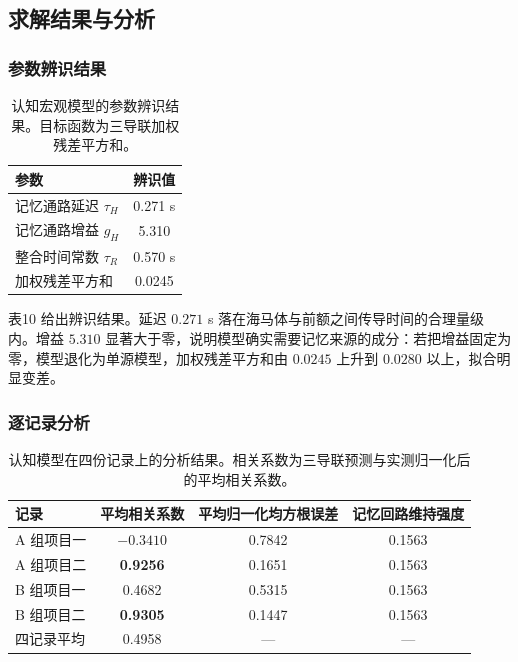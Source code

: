 \documentclass[bwprint]{gmcmthesis}
\begin{document}
\subsection{求解结果与分析}

\subsubsection{参数辨识结果}

\begin{table}[htp!]
\centering
\renewcommand\arraystretch{1.2}
\caption{认知宏观模型的参数辨识结果。目标函数为三导联加权残差平方和。}
\begin{tabular}{|l|c|}
  \hline
  参数 & 辨识值 \\
  \hline
  记忆通路延迟 $\tau_H$ & 0.271 s \\
  \hline
  记忆通路增益 $g_H$ & 5.310 \\
  \hline
  整合时间常数 $\tau_R$ & 0.570 s \\
  \hline
  加权残差平方和 & 0.0245 \\
  \hline
\end{tabular}
\end{table}

表10 给出辨识结果。延迟 $0.271$ s 落在海马体与前额之间传导时间的合理量级内。增益 $5.310$ 显著大于零，说明模型确实需要记忆来源的成分：若把增益固定为零，模型退化为单源模型，加权残差平方和由 $0.0245$ 上升到 $0.0280$ 以上，拟合明显变差。

\subsubsection{逐记录分析}

\begin{table}[htp!]
\centering
\renewcommand\arraystretch{1.2}
\caption{认知模型在四份记录上的分析结果。相关系数为三导联预测与实测归一化后的平均相关系数。}
\begin{tabular}{|l|c|c|c|}
  \hline
  记录 & 平均相关系数 & 平均归一化均方根误差 & 记忆回路维持强度 \\
  \hline
  A 组项目一 & $-0.3410$ & 0.7842 & 0.1563 \\
  \hline
  A 组项目二 & \textbf{0.9256} & 0.1651 & 0.1563 \\
  \hline
  B 组项目一 & 0.4682 & 0.5315 & 0.1563 \\
  \hline
  B 组项目二 & \textbf{0.9305} & 0.1447 & 0.1563 \\
  \hline
  四记录平均 & 0.4958 & --- & --- \\
  \hline
\end{tabular}
\end{table}
\end{document}
